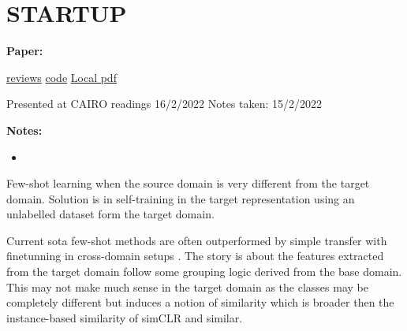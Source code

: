 \clearpage

\section{STARTUP}\label{sec:startup}

\begin{notebox}
\textbf{Paper: } 
\vspace{5pt}

\href{https://openreview.net/forum?id=O3Y56aqpChA}{reviews}
\hspace{1cm}
\href{https://github.com/cpphoo/STARTUP}{code}
\hspace{1cm}
\href{run:/home/magda/Dropbox/Zot/Phoo_Hariharan_2021_Self-training for Few-shot Transfer Across Extreme Task Differences}{Local pdf}
\vspace{3pt}

Presented at CAIRO readings 16/2/2022
\hfill Notes taken: 15/2/2022 
\end{notebox}

\begin{notebox}[colback=red!5]
\tldr 
\end{notebox}

\begin{notebox}[colback=yellow!5]
\textbf{Notes:} 
\begin{itemize}[nosep]
\item 
\end{itemize}
\end{notebox}

Few-shot learning when the source domain is very different from the target domain. Solution is in self-training in the target representation using an unlabelled dataset form the target domain.

Current sota few-shot methods are often outperformed by simple transfer with finetunning in cross-domain setups \cite{wallace_extending_2020,guo_broader_2020}.
The story is about the features extracted from the target domain follow some grouping logic derived from the base domain. This may not make much sense in the target domain as the classes may be completely different but induces a notion of similarity which is broader then the instance-based similarity of simCLR\parencite{chen_simple_2020} and similar. 

